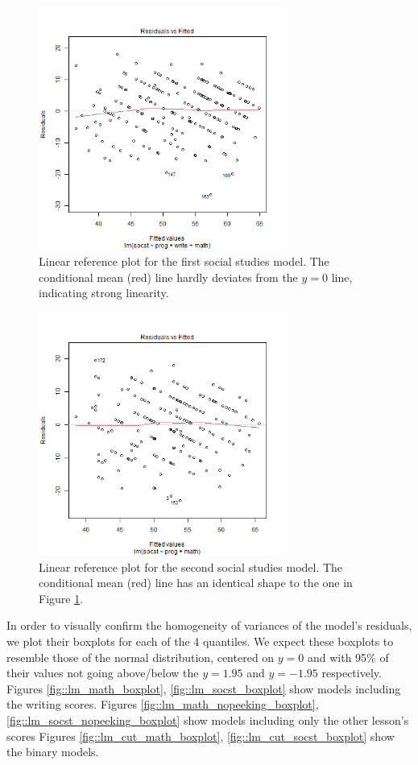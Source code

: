 \documentclass[10pt, a4paper]{article}
\begin{document}
	\begin{figure}
		\includegraphics[width=8cm]{lm_socst_linear_plot.png}
		\centering
		\caption{Linear reference plot for the first social studies model. The conditional mean (red) line hardly deviates from the $y=0$ line, indicating strong linearity.}
		\label{fig::lm_socst_linear}
	\end{figure}
	
	\begin{figure}
		\includegraphics[width=8cm]{lm_socst_nopeek_linear_plot.png}
		\centering
		\caption{Linear reference plot for the second social studies model. The conditional mean (red) line has an identical shape to the one in Figure \ref{fig::lm_socst_linear}.}
		\label{fig::lm_socst_nopeek_linear}
	\end{figure}
	
	In order to visually confirm the homogeneity of variances of the model's residuals, we plot their boxplots for each of the 4 quantiles. We expect these boxplots to resemble those of the normal distribution, centered on $y=0$ and with 95\% of their values not going above/below the $y=1.95$ and $y=-1.95$ respectively. Figures \ref{fig::lm_math_boxplot}, \ref{fig::lm_socst_boxplot} show models including the writing scores. Figures \ref{fig::lm_math_nopeeking_boxplot}, \ref{fig::lm_socst_nopeeking_boxplot} show models including only the other lesson's scores Figures \ref{fig::lm_cut_math_boxplot}, \ref{fig::lm_cut_socst_boxplot} show the binary models.
	
\end{document}
